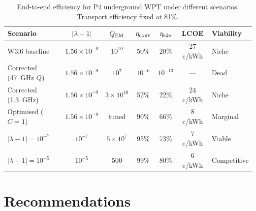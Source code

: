 \documentclass[11pt]{article}
\newcommand{\ee}[1]{\times 10^{#1}}
\newcommand{\lambdaone}{|\lambda{-}1|}
\newcommand{\QEM}{Q_{\rm EM}}
\begin{document}
\begin{table}[H]
\centering
\caption{End-to-end efficiency for P4 underground WPT under different
scenarios. Transport efficiency fixed at 81\%.}
\label{tab:e2e-scenarios}
\begin{tabular}{@{}lcccccl@{}}
\toprule
Scenario & $\lambdaone$ & $\QEM$ & $\eta_{\rm conv}$ & $\eta_{\rm e2e}$
  & LCOE & Viability \\
\midrule
W3i6 baseline & $1.56\ee{-9}$ & $10^{10}$ & 50\% & 20\% & 27 c/kWh
  & Niche \\
Corrected (47~GHz $Q$) & $1.56\ee{-9}$ & $10^{7}$ & $10^{-6}$ & $10^{-13}$
  & --- & Dead \\
Corrected (1.3~GHz) & $1.56\ee{-9}$ & $3\ee{10}$ & 52\% & 22\% & 24 c/kWh
  & Niche \\
Optimised ($C=1$) & $1.56\ee{-9}$ & tuned & 90\% & 66\% & 8 c/kWh
  & Marginal \\
$\lambdaone = 10^{-7}$ & $10^{-7}$ & $5\ee{7}$ & 95\% & 73\% & 7 c/kWh
  & Viable \\
$\lambdaone = 10^{-5}$ & $10^{-5}$ & $500$ & 99\% & 80\% & 6 c/kWh
  & Competitive \\
\bottomrule
\end{tabular}
\end{table}

\section{Recommendations}
\label{sec:recommendations}
\end{document}
